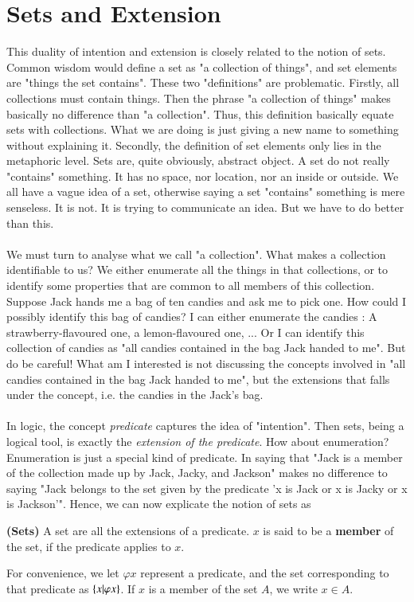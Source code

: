 \section{Sets and Extension}
This duality of intention and extension is closely related to the notion of sets. Common wisdom would define a set as "a collection of things", and set elements are "things the set contains". These two "definitions" are problematic. Firstly, all collections must contain things. Then the phrase "a collection of things" makes basically no difference than "a collection". Thus, this definition basically equate sets with collections. What we are doing is just giving a new name to something without explaining it. Secondly, the definition of set elements only lies in the metaphoric level. Sets are, quite obviously, abstract object. A set do not really "contains" something. It has no space, nor location, nor an inside or outside. We all have a vague idea of a set, otherwise saying a set "contains" something is mere senseless. It is not. It is trying to communicate an idea. But we have to do better than this. \\
~\\
We must turn to analyse what we call "a collection". What makes a collection identifiable to us? We either enumerate all the things in that collections, or to identify some properties that are common to all members of this collection. Suppose Jack hands me a bag of ten candies and ask me to pick one. How could I possibly identify this bag of candies? I can either enumerate the candies : A strawberry-flavoured one, a lemon-flavoured one, ... Or I can identify this collection of candies as "all candies contained in the bag Jack handed to me". But do be careful! What am I interested is not discussing the concepts involved in "all candies contained in the bag Jack handed to me", but the extensions that falls under the concept, i.e. the candies in the Jack's bag. \\
~\\
In logic, the concept \textit{predicate} captures the idea of "intention". Then sets, being a logical tool, is exactly the \textit{extension of the predicate}. How about enumeration? Enumeration is just a special kind of predicate. In saying that "Jack is a member of the collection made up by Jack, Jacky, and Jackson" makes no difference to saying "Jack belongs to the set given by the predicate 'x is Jack or x is Jacky or x is Jackson'". Hence, we can now explicate the notion of sets as
\begin{defn}
    \textbf{(Sets)} A set are all the extensions of a predicate. $x$ is said to be a \textbf{member} of the set, if the predicate applies to $x$.
\end{defn}
For convenience, we let $\varphi x$ represent a predicate, and the set corresponding to that predicate as $\{x|\varphi x\}$. If $x$ is a member of the set $A$, we write $x\in A$.\\
~\\

